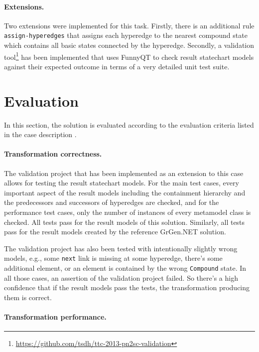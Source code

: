 \documentclass[submission]{eptcs}
\begin{document}
\paragraph{Extensions.}
\label{sec:extensions}

\begin{sloppypar}
  Two extensions were implemented for this task.  Firstly, there is an
  additional rule \verb|assign-hyperedges| that assigns each hyperedge to the
  nearest compound state which contains all basic states connected by the
  hyperedge.  Secondly, a validation
  tool\footnote{\url{https://github.com/tsdh/ttc-2013-pn2sc-validation}} has
  been implemented that uses FunnyQT to check result statechart models against
  their expected outcome in terms of a very detailed unit test suite.
\end{sloppypar}
\section{Evaluation}
\label{sec:evaluation}

In this section, the solution is evaluated according to the evaluation criteria
listed in the case description \cite{pn2sccasedesc}.

\paragraph{Transformation correctness.}

The validation project that has been implemented as an extension to this case
allows for testing the result statechart models.  For the main test cases,
every important aspect of the result models including the containment hierarchy
and the predecessors and successors of hyperedges are checked, and for the
performance test cases, only the number of instances of every metamodel class
is checked.  All tests pass for the result models of this solution.  Similarly,
all tests pass for the result models created by the reference GrGen.NET
solution.

The validation project has also been tested with intentionally slightly wrong
models, e.g., some \verb|next| link is missing at some hyperedge, there's some
additional element, or an element is contained by the wrong \verb|Compound|
state.  In all those cases, an assertion of the validation project failed.  So
there's a high confidence that if the result models pass the tests, the
transformation producing them is correct.

\paragraph{Transformation performance.}
\end{document}
